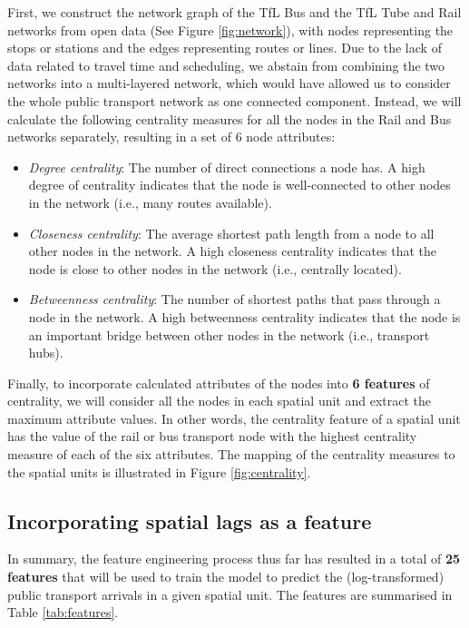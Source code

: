 First, we construct the network graph of the TfL Bus and the TfL Tube and Rail networks from open data (See Figure \ref{fig:network}), with nodes representing the stops or stations and the edges representing routes or lines. Due to the lack of data related to travel time and scheduling, we abstain from combining the two networks into a multi-layered network, which would have allowed us to consider the whole public transport network as one connected component. Instead, we will calculate the following centrality measures for all the nodes in the Rail and Bus networks separately, resulting in a set of 6 node attributes:

\pagebreak[4] %
\begin{itemize}
    \setlength\itemsep{0em}
    \item \textit{Degree centrality}: The number of direct connections a node has. A high degree of centrality indicates that the node is well-connected to other nodes in the network (i.e., many routes available).
    \item \textit{Closeness centrality}: The average shortest path length from a node to all other nodes in the network. A high closeness centrality indicates that the node is close to other nodes in the network (i.e., centrally located). 
    \item \textit{Betweenness centrality}: The number of shortest paths that pass through a node in the network. A high betweenness centrality indicates that the node is an important bridge between other nodes in the network (i.e., transport hubs).
\end{itemize}

Finally, to incorporate calculated attributes of the nodes into \textbf{6 features} of centrality, we will consider all the nodes in each spatial unit and extract the maximum attribute values. In other words, the centrality feature of a spatial unit has the value of the rail or bus transport node with the highest centrality measure of each of the six attributes. The mapping of the centrality measures to the spatial units is illustrated in Figure \ref{fig:centrality}.

\subsection{Incorporating spatial lags as a feature}

In summary, the feature engineering process thus far has resulted in a total of \textbf{25 features} that will be used to train the model to predict the (log-transformed) public transport arrivals in a given spatial unit. The features are summarised in Table \ref{tab:features}.

